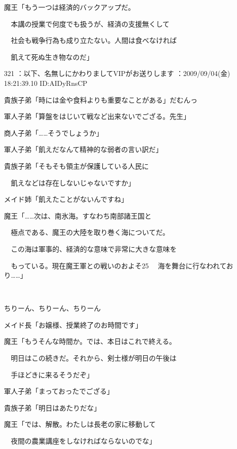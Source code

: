 \documentclass[a4j,twocolumn]{tarticle}
\begin{document}
魔王「もう一つは経済的バックアップだ。\par{} 
　本講の授業で何度でも扱うが、経済の支援無くして\par{} 
　社会も戦争行為も成り立たない。人間は食べなければ\par{} 
　飢えて死ぬ生き物なのだ」 

	
    
    

321 ：以下、名無しにかわりましてVIPがお送りします ：2009/09/04(金) 18:21:39.10 ID:AIDyRnsCP 


貴族子弟「時には金や食料よりも重要なことがある」だむんっ\par{} 
軍人子弟「算盤をはじいて戦など出来ないでござる。先生」\par{} 
商人子弟「……そうでしょうか」 



軍人子弟「飢えだなんて精神的な弱者の言い訳だ」\par{} 
貴族子弟「そもそも領主が保護している人民に\par{} 
　飢えなどは存在しないじゃないですか」 



メイド姉「飢えたことがないんですね」 



魔王「……次は、南氷海。すなわち南部諸王国と\par{} 
　極点である、魔王の大陸を取り巻く海についてだ。\par{} 
　この海は軍事的、経済的な意味で非常に大きな意味を\par{} 
　もっている。現在魔王軍との戦いのおよそ25%
　海を舞台に行なわれており……」 

　

ちりーん、ちりーん、ちりーん 



メイド長「お嬢様、授業終了のお時間です」 



魔王「もうそんな時間か。では、本日はこれで終える。\par{} 
　明日はこの続きだ。それから、剣士様が明日の午後は\par{} 
　手ほどきに来るそうだぞ」 



軍人子弟「まっておったでござる」\par{} 
貴族子弟「明日はあたりだな」 



魔王「では、解散。わたしは長老の家に移動して\par{} 
　夜間の農業講座をしなければならないのでな」 
\end{document}
